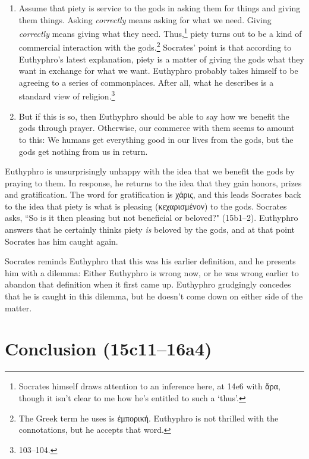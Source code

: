 \documentclass[11pt]{article}
\begin{document}
\begin{enumerate}
    \item Assume that piety is service to the gods in asking them for things and giving them things.  Asking \emph{correctly} means asking for what we need.  Giving \emph{correctly} means giving what they need.  Thus,\footnote{Socrates himself draws attention to an inference here, at 14e6 with ἄρα, though it isn't clear to me how he's entitled to such a `thus'.} piety turns out to be a kind of commercial interaction with the gods.\footnote{The Greek term he uses is ἐμπορική.  Euthyphro is not thrilled with the connotations, but he accepts that word.}  Socrates' point is that according to Euthyphro's latest explanation, piety is a matter of giving the gods what they want in exchange for what we want.  Euthyphro probably takes himself to be agreeing to a series of commonplaces.  After all, what he describes is a standard  view of religion.\footnote{\citet{bailly2003} 103--104.}
    \item But if this is so, then Euthyphro should be able to say how we benefit the gods through prayer.  Otherwise, our commerce with them seems to amount to this: We humans get everything good in our lives from the gods, but the gods get nothing from us in return.
\end{enumerate}

Euthyphro is unsurprisingly unhappy with the idea that we benefit the gods by praying to them. In response, he returns to the idea that they gain honors, prizes and gratification.  The word for gratification is χάρις, and this leads Socrates back to the idea that piety is what is pleasing (κεχαρισμένον) to the gods.  Socrates asks, ``So is it then pleasing but not beneficial or beloved?" (15b1--2).  Euthyphro answers that he certainly thinks piety \emph{is} beloved by the gods, and at that point Socrates has him caught again.

Socrates reminds Euthyphro that this was his earlier definition, and he presents him with a dilemma: Either Euthyphro is wrong now, or he was wrong earlier to abandon that definition when it first came up.  Euthyphro grudgingly concedes that he is caught in this dilemma, but he doesn't come down on either side of the matter.

\section{Conclusion (15c11--16a4)}
\end{document}
